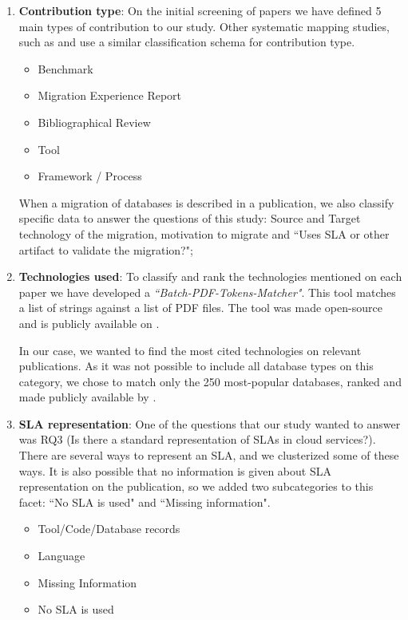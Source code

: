 \documentclass{article}
\begin{document}
\begin{enumerate}
    \item \textbf{Contribution type}: On the initial screening of papers we have defined 5 main types of contribution to our study. Other systematic mapping studies, such as \cite{6405289} and \cite{Ameller201542} use a similar classification schema for contribution type.
    \begin{itemize}
      \item Benchmark
      \item Migration Experience Report
      \item Bibliographical Review
      \item Tool
      \item Framework / Process
    \end{itemize}

    When a migration of databases is described in a publication, we also classify specific data to answer the questions of this study:  Source and Target technology of the migration, motivation to migrate and ``Uses SLA or other artifact to validate the migration?"; 

    \item \textbf{Technologies used}: To classify and rank the technologies mentioned on each paper we have developed a \textit{``Batch-PDF-Tokens-Matcher"}. This tool matches a list of strings against a list of PDF files. The tool was made open-source and is publicly available on \cite{pythonBatchPDFTokenMatcher}.

    In our case, we wanted to find the most cited technologies on relevant publications. As it was not possible to include all database types on this category, we chose to match only the 250 most-popular databases, ranked and made publicly available by \cite{dbranking}.

    \item \textbf{SLA representation}: One of the questions that our study wanted to answer was RQ3 (Is there a standard representation of SLAs in cloud services?). There are several ways to represent an SLA, and we clusterized some of these ways. It is also possible that no information is given about SLA representation on the publication, so we added two subcategories to this facet: ``No SLA is used" and ``Missing information".  
    \begin{itemize}
      \item Tool/Code/Database records
      \item Language
      \item Missing Information
      \item No SLA is used
    \end{itemize}  
\end{enumerate}
\end{document}
